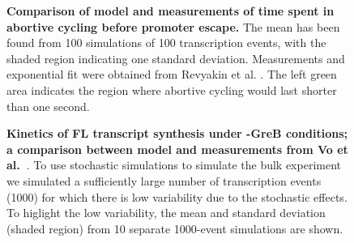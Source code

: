 \begin{figure}[h]
  \caption{{\bf Comparison of model and measurements of time spent in abortive
        cycling before promoter escape.} The mean has been found from 100
        simulations of 100 transcription events, with the shaded region
        indicating one standard deviation. Measurements and exponential fit
        were obtained from Revyakin et al. \cite{revyakin_abortive_2006}. The
        left green area indicates the region where abortive cycling would last
        shorter than one second.}
\label{fig:revyakin_fit}
\end{figure}

\begin{figure}[h]
    \caption{ {\bf Kinetics of FL transcript synthesis under -GreB conditions;
        a comparison between model and measurements from Vo
      et al.~\cite{vo_vitro_2003-1}}. To use stochastic simulations to
      simulate the bulk experiment we simulated a sufficiently large number of
      transcription events (1000) for which there is low variability due to
      the stochastic effects. To higlight the low variability, the mean and
      standard deviation (shaded region) from 10 separate 1000-event
      simulations are shown.}
\label{fig:vo_comparison}
\end{figure}
